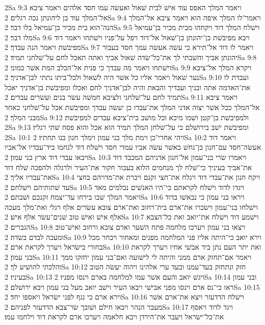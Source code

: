 2Sa 9:3  ויאמר המלך האפס עוד אישׁ לבית שׁאול ואעשׂה עמו חסד אלהים ויאמר ציבא אל־המלך עוד בן ליהונתן נכה רגלים׃
2Sa 9:4  ויאמר־לו המלך איפה הוא ויאמר ציבא אל־המלך הנה־הוא בית מכיר בן־עמיאל בלו דבר׃
2Sa 9:5  וישׁלח המלך דוד ויקחהו מבית מכיר בן־עמיאל מלו דבר׃
2Sa 9:6  ויבא מפיבשׁת בן־יהונתן בן־שׁאול אל־דוד ויפל על־פניו וישׁתחו ויאמר דוד מפיבשׁת ויאמר הנה עבדך׃
2Sa 9:7  ויאמר לו דוד אל־תירא כי עשׂה אעשׂה עמך חסד בעבור יהונתן אביך והשׁבתי לך את־כל־שׂדה שׁאול אביך ואתה תאכל לחם על־שׁלחני תמיד׃
2Sa 9:8  וישׁתחו ויאמר מה עבדך כי פנית אל־הכלב המת אשׁר כמוני׃
2Sa 9:9  ויקרא המלך אל־ציבא נער שׁאול ויאמר אליו כל אשׁר היה לשׁאול ולכל־ביתו נתתי לבן־אדניך׃
2Sa 9:10  ועבדת לו את־האדמה אתה ובניך ועבדיך והבאת והיה לבן־אדניך לחם ואכלו ומפיבשׁת בן־אדניך יאכל תמיד לחם על־שׁלחני ולציבא חמשׁה עשׂר בנים ועשׂרים עבדים׃
2Sa 9:11  ויאמר ציבא אל־המלך ככל אשׁר יצוה אדני המלך את־עבדו כן יעשׂה עבדך ומפיבשׁת אכל על־שׁלחני כאחד מבני המלך׃
2Sa 9:12  ולמפיבשׁת בן־קטן ושׁמו מיכא וכל מושׁב בית־ציבא עבדים למפיבשׁת׃
2Sa 9:13  ומפיבשׁת ישׁב בירושׁלם כי על־שׁלחן המלך תמיד הוא אכל והוא פסח שׁתי רגליו׃
2Sa 10:1  ויהי אחרי־כן וימת מלך בני עמון וימלך חנון בנו תחתיו׃
2Sa 10:2  ויאמר דוד אעשׂה־חסד עם־חנון בן־נחשׁ כאשׁר עשׂה אביו עמדי חסד וישׁלח דוד לנחמו ביד־עבדיו אל־אביו ויבאו עבדי דוד ארץ בני עמון׃
2Sa 10:3  ויאמרו שׂרי בני־עמון אל־חנון אדניהם המכבד דוד את־אביך בעיניך כי־שׁלח לך מנחמים הלוא בעבור חקור את־העיר ולרגלה ולהפכה שׁלח דוד את־עבדיו אליך׃
2Sa 10:4  ויקח חנון את־עבדי דוד ויגלח את־חצי זקנם ויכרת את־מדויהם בחצי עד שׁתותיהם וישׁלחם׃
2Sa 10:5  ויגדו לדוד וישׁלח לקראתם כי־היו האנשׁים נכלמים מאד ויאמר המלך שׁבו בירחו עד־יצמח זקנכם ושׁבתם׃
2Sa 10:6  ויראו בני עמון כי נבאשׁו בדוד וישׁלחו בני־עמון וישׂכרו את־ארם בית־רחוב ואת־ארם צובא עשׂרים אלף רגלי ואת־מלך מעכה אלף אישׁ ואישׁ טוב שׁנים־עשׂר אלף אישׁ׃
2Sa 10:7  וישׁמע דוד וישׁלח את־יואב ואת כל־הצבא הגברים׃
2Sa 10:8  ויצאו בני עמון ויערכו מלחמה פתח השׁער וארם צובא ורחוב ואישׁ־טוב ומעכה לבדם בשׂדה׃
2Sa 10:9  וירא יואב כי־היתה אליו פני המלחמה מפנים ומאחור ויבחר מכל בחורי בישׂראל ויערך לקראת ארם׃
2Sa 10:10  ואת יתר העם נתן ביד אבשׁי אחיו ויערך לקראת בני עמון׃
2Sa 10:11  ויאמר אם־תחזק ארם ממני והיתה לי לישׁועה ואם־בני עמון יחזקו ממך והלכתי להושׁיע לך׃
2Sa 10:12  חזק ונתחזק בעד־עמנו ובעד ערי אלהינו ויהוה יעשׂה הטוב בעיניו׃
2Sa 10:13  ויגשׁ יואב והעם אשׁר עמו למלחמה בארם וינסו מפניו׃
2Sa 10:14  ובני עמון ראו כי־נס ארם וינסו מפני אבישׁי ויבאו העיר וישׁב יואב מעל בני עמון ויבא ירושׁלם׃
2Sa 10:15  וירא ארם כי נגף לפני ישׂראל ויאספו יחד׃
2Sa 10:16  וישׁלח הדדעזר ויצא את־ארם אשׁר מעבר הנהר ויבאו חילם ושׁובך שׂר־צבא הדדעזר לפניהם׃
2Sa 10:17  ויגד לדוד ויאסף את־כל־ישׂראל ויעבר את־הירדן ויבא חלאמה ויערכו ארם לקראת דוד וילחמו עמו׃
